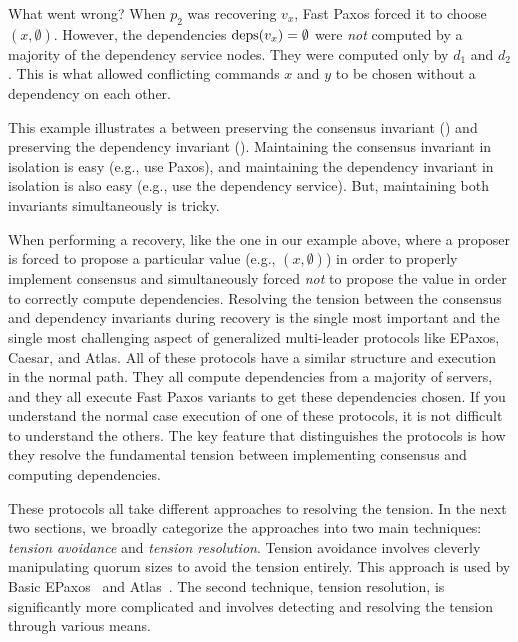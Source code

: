 What went wrong? When $p_2$ was recovering $v_x$, Fast Paxos forced it to
choose $(x, \emptyset{})$. However, the dependencies $\text{deps}(v_x) = \emptyset{}$
were \emph{not} computed by a majority of the dependency service nodes. They
were computed only by $d_1$ and $d_2$. This is what allowed conflicting
commands $x$ and $y$ to be chosen without a dependency on each other.

This example illustrates a  between preserving
the consensus invariant () and preserving the
dependency invariant (). Maintaining the consensus
invariant in isolation is easy (e.g., use Paxos), and maintaining the
dependency invariant in isolation is also easy (e.g., use the dependency
service). But, maintaining both invariants simultaneously is tricky.

When performing a recovery, like the one in our example above, where a proposer
is forced to propose a particular value (e.g., $(x, \emptyset{})$) in order to
properly implement consensus and simultaneously forced \emph{not} to propose
the value in order to correctly compute dependencies.
%
Resolving the tension between the consensus and dependency invariants during
recovery is the single most important and the single most challenging aspect of
generalized multi-leader protocols like EPaxos, Caesar, and Atlas. All of these
protocols have a similar structure and execution in the normal path. They all
compute dependencies from a majority of servers, and they all execute Fast
Paxos variants to get these dependencies chosen. If you understand the normal
case execution of one of these protocols, it is not difficult to understand the
others. The key feature that distinguishes the protocols is how they resolve
the fundamental tension between implementing consensus and computing
dependencies.

These protocols all take different approaches to resolving the tension. In the
next two sections, we broadly categorize the approaches into two main
techniques: \emph{tension avoidance} and \emph{tension resolution}.  Tension
avoidance involves cleverly manipulating quorum sizes to avoid the tension
entirely. This approach is used by Basic EPaxos~\cite{moraru2013proof} and
Atlas~\cite{enes2020state}. The second technique, tension resolution, is
significantly more complicated and involves detecting and resolving the tension
through various means.
